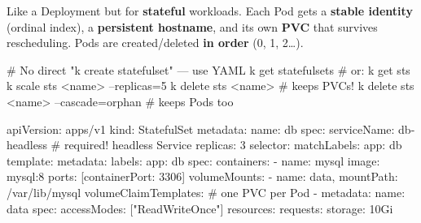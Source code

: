 \begin{tcbitemize}[
  raster columns=2, raster equal height=rows,
  blanker, cheat subtitle
]

  \tcbitem[raster multicolumn=2]
    {\fontsize{6.5}{7.5}\selectfont\sffamily
    Like a Deployment but for \textbf{stateful} workloads. Each Pod gets a \textbf{stable identity} (ordinal index), a \textbf{persistent hostname}, and its own \textbf{PVC} that survives rescheduling. Pods are created/deleted \textbf{in order} (0, 1, 2\ldots).\par}

  \tcbitem
    \begin{tcbitemize}[
      raster columns=1, raster equal height=rows,
      blanker, cheat subtitle
    ]

      \tcbitem


        \begin{cheatcodebash}
        # No direct "k create statefulset" — use YAML
        k get statefulsets      # or: k get sts
        k scale sts <name> --replicas=5
        k delete sts <name>                # keeps PVCs!
        k delete sts <name> --cascade=orphan  # keeps Pods too
        \end{cheatcodebash}

      \tcbitem

        \begin{cheatcodebashbold}
        apiVersion: apps/v1
        kind: StatefulSet
        metadata: {name: db}
        spec:
          serviceName: db-headless   # required! headless Service
          replicas: 3
          selector: {matchLabels: {app: db}}
          template:
            metadata: {labels: {app: db}}
            spec:
              containers:
              - name: mysql
                image: mysql:8
                ports: [{containerPort: 3306}]
                volumeMounts:
                - {name: data, mountPath: /var/lib/mysql}
          volumeClaimTemplates:      # one PVC per Pod
          - metadata: {name: data}
            spec:
              accessModes: ["ReadWriteOnce"]
              resources:
                requests: {storage: 10Gi}
        \end{cheatcodebashbold}



\end{tcbitemize}
\end{tcbitemize}
